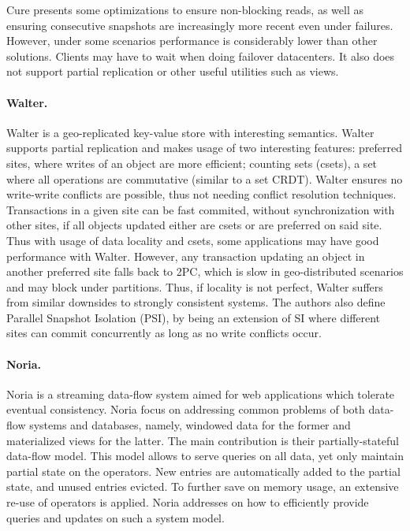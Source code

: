 Cure presents some optimizations to ensure non-blocking reads, as well as ensuring consecutive snapshots are increasingly more recent even under failures.
However, under some scenarios performance is considerably lower than other solutions.
Clients may have to wait when doing failover datacenters.
It also does not support partial replication or other useful utilities such as views.	

\paragraph{Walter.} Walter \cite{walter} is a geo-replicated key-value store with interesting semantics.
Walter supports partial replication and makes usage of two interesting features: preferred sites, where writes of an object are more efficient; counting sets (csets), a set where all operations are commutative (similar to a set CRDT).
Walter ensures no write-write conflicts are possible, thus not needing conflict resolution techniques.
Transactions in a given site can be fast commited, without synchronization with other sites, if all objects updated either are csets or are preferred on said site.
Thus with usage of data locality and csets, some applications may have good performance with Walter.
However, any transaction updating an object in another preferred site falls back to 2PC, which is slow in geo-distributed scenarios and may block under partitions.
Thus, if locality is not perfect, Walter suffers from similar downsides to strongly consistent systems.
The authors also define Parallel Snapshot Isolation (PSI), by being an extension of SI where different sites can commit concurrently as long as no write conflicts occur.

\paragraph{Noria.} Noria \cite{noria} is a streaming data-flow system aimed for web applications which tolerate eventual consistency.
Noria focus on addressing common problems of both data-flow systems and databases, namely, windowed data for the former and materialized views for the latter.
The main contribution is their partially-stateful data-flow model.
This model allows to serve queries on all data, yet only maintain partial state on the operators.
New entries are automatically added to the partial state, and unused entries evicted.
To further save on memory usage, an extensive re-use of operators is applied.
Noria addresses on how to efficiently provide queries and updates on such a system model.

